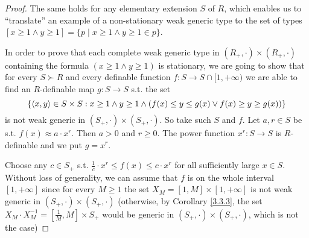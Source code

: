 \documentclass[11pt]{article}
\begin{document}
\begin{proof}
The same holds for any elementary extension \(S\) of \(R\), which enables us to ``translate'' an
example of a non-stationary weak generic type to the set of
types \([x\ge 1\wedge y\ge 1]=\{p\mid x\ge 1\wedge y\ge 1\in p\}\).

In order to prove that each complete weak generic type in \((R_+,\cdot)\times(R_+,\cdot)\) containing the
formula \((x\ge 1\wedge y\ge 1)\) is stationary, we are going to show that for every \(S\succ R\) and every
definable function \(f:S\to S\cap[1,+\infty)\) we are able to find an \(R\)-definable map \(g:S\to S\) s.t.
the set
\begin{equation*}
\{\langle x,y\rangle\in S\times S:x\ge 1\wedge y\ge 1\wedge(f(x)\le y\le g(x)\vee f(x)\ge y\ge g(x))\}
\end{equation*}
is not weak generic in \((S_+,\cdot)\times(S_+,\cdot)\). So take such \(S\) and \(f\). Let \(a,r\in S\) be
s.t. \(f(x)\approx a\cdot x^r\). Then \(a>0\) and \(r\ge 0\). The power function \(x^r:S\to S\)
is \(R\)-definable and we put \(g=x^r\).

Choose any \(c\in S_+\) s.t. \(\frac{1}{c}\cdot x^r\le f(x)\le c\cdot x^r\) for all sufficiently large \(x\in S\).
Without loss of generality, we can assume that \(f\) is on the whole interval \([1,+\infty]\) since
for every \(M\ge 1\) the set \(X_M=[1,M]\times[1,+\infty]\) is not weak generic in \((S_+,\cdot)\times(S_+,\cdot)\)
(otherwise, by Corollary \ref{3.3.3}, the set \(X_M\cdot X^{-1}_M=[\frac{1}{M},M]\times S_+\) would be
generic in \((S_+,\cdot)\times(S_+,\cdot)\), which is not the case)


\end{proof}
\end{document}
